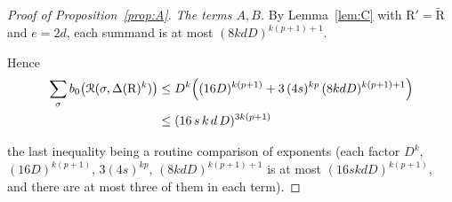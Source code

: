\documentclass[10pt]{amsart}
\theoremstyle{definition}
\theoremstyle{remark}
\numberwithin{equation}{section}
\newcommand {\R} {\mathrm{R}}
\newcommand {\RR} {{\mathcal R}}
\newcommand{\Rt}{\widetilde{\R}}
\begin{document}
\begin{proof}[Proof of Proposition~\ref{prop:A}]
\emph{The terms $A,B$.} By Lemma~\ref{lem:C} with $\R'=\Rt$ and $e=2d$, each summand is at most $(8kdD)^{k(p+1)+1}$.

Hence
\begin{align*}
\sum_\sigma b_0\bigl(\RR(\sigma,\Delta(\R)^k)\bigr) \leq& \; D^k\Bigl((16D)^{k(p+1)}+3\,(4s)^{kp}\,(8kdD)^{k(p+1)+1}\Bigr) \\
\leq& \; (16\,s\,k\,d\,D)^{3k(p+1)}
\end{align*}

the last inequality being a routine comparison of exponents (each factor $D^k$, $(16D)^{k(p+1)}$, $3(4s)^{kp}$, $(8kdD)^{k(p+1)+1}$ is at most $(16skdD)^{k(p+1)}$, and there are at most three of them in each term).
\end{proof}




\end{document}
